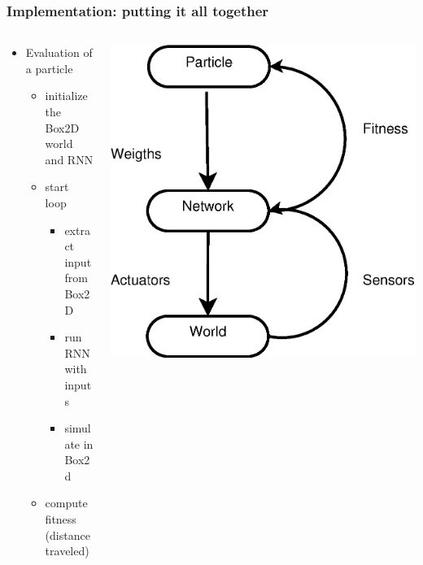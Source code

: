 \documentclass{beamer}
\begin{document}
\begin{frame}[fragile]
  \frametitle{Implementation: putting it all together}

  \begin{columns}
    \begin{column}{0.6\textwidth}
      \begin{itemize}
      \item Evaluation of a particle
	\begin{itemize}
	  \item initialize the Box2D world and RNN
	  \item start loop
	  \begin{itemize}
	    \item extract input from Box2D
	    \item run RNN with inputs
	    \item simulate in Box2d
	  \end{itemize}
	  \item compute fitness (distance traveled)
	\end{itemize}
      \end{itemize}
    \end{column}

    \begin{column}{0.4\textwidth}
    \includegraphics[scale=0.4]{diagram.eps}
    \end{column}

  \end{columns}
\end{frame}
\end{document}
